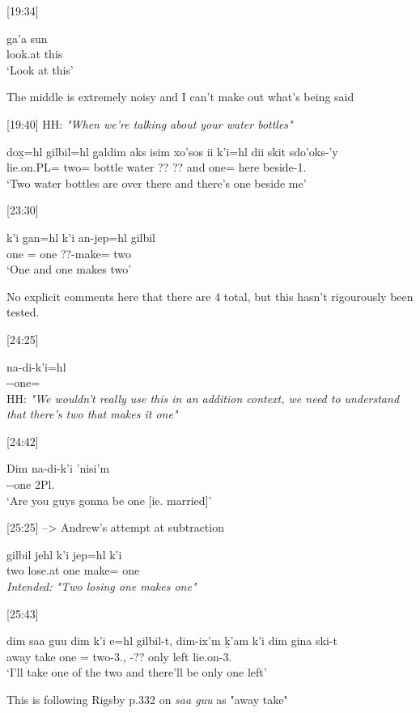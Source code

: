 [19:34]
\begin{exe}
\ex \gll ga'a sun\\
look.at this\\
`Look at this'
\end{exe}

The middle is extremely noisy and I can't make out what's being said

[19:40] HH: \textit{"When we're talking about your water bottles"}
\begin{exe}
\ex \gll dox̱=hl gilbil=hl g̱aldim aks isim xo'sos ii k'i=hl dii skit sdo'oks-'y\\
lie.on.PL=\Cn{} two=\Cn{} bottle water ?? ?? and one=\Cn{} \Foc{} here beside-1.\Ii{} \\
`Two water bottles are over there and there's one beside me'
\end{exe}

[23:30]
\begin{exe}
\ex \gll k'i g̱an=hl k'i an-jep=hl gilbil\\
one \Pcnj{}=\Cn{} one ??-make=\Cn{} two\\
`One and one makes two'
\end{exe}
No explicit comments here that there are 4 total, but this hasn't rigourously been tested.

[24:25]
\begin{exe}
\ex \gll na-di-k'i=hl\\
\Recp{}-\Com-one=\Cn{}\\
HH: \textit{"We wouldn't really use this in an addition context, we need to understand that there's two that makes it one"}
\end{exe}

[24:42]
\begin{exe}
\ex \gll Dim na-di-k'i 'nisi'm\\
\Fut{} \Recp{}-\Com{}-one 2Pl.\Iii{}\\
`Are you guys gonna be one [ie. married]'
\end{exe}

[25:25] --> Andrew's attempt at subtraction
\begin{exe}
\ex \gll gilbil jehl k'i jep=hl k'i\\
two lose.at one make=\Cn{} one\\
\textit{Intended: "Two losing one makes one"}
\end{exe}

[25:43]
\begin{exe}
\ex \gll dim saa guu dim k'i e=hl gilbil-t, dim-ix'm ḵ'am k'i dim gina ski-t\\
\Fut{} away take \Fut{} one \Prep{}=\Cn{} two-3.\Ii{}, \Fut{}-?? only \Fut{} left lie.on-3.\Ii{}\\
`I'll take one of the two and there'll be only one left'
\end{exe}
This is following Rigsby p.332 on \textit{saa guu} as "away take"

